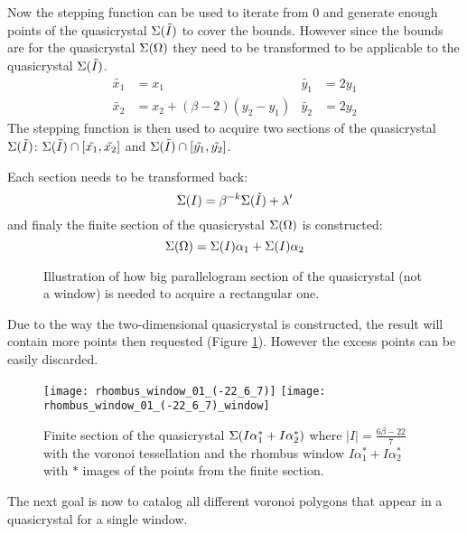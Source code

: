 \documentclass[text.tex]{subfiles}
\begin{document}
Now the stepping function can be used to iterate from 0 and generate enough points of the quasicrystal $\Sigma(\tilde{I})$ to cover the bounds. However since the bounds are for the quasicrystal $\Sigma(\Omega)$ they need to be transformed to be applicable to the quasicrystal $\Sigma(\tilde{I})$. 
\begin{align*}
\tilde{x_1} &= x_1 & \tilde{y_1} &= 2y_1 \\
\tilde{x_2} &= x_2 + (\beta-2)(y_2-y_1) & \tilde{y_2} &= 2y_2 
\end{align*}
The stepping function is then used to acquire two sections of the quasicrystal $\Sigma(\tilde{I})$: $\Sigma(\tilde{I})\cap[\tilde{x_1},\tilde{x_2}]$ and $\Sigma(\tilde{I})\cap[\tilde{y_1},\tilde{y_2}]$.

Each section needs to be transformed back:
$$\Sigma(I) = \beta^{-k}\Sigma(\tilde{I}) + \lambda'$$
and finaly the finite section of the quasicrystal $\Sigma(\Omega)$ is constructed:
$$\Sigma(\Omega) = \Sigma(I)\alpha_1 + \Sigma(I)\alpha_2$$

\begin{figure}[h]
\centering
{}
\caption{Illustration of how big parallelogram section of the quasicrystal (not a window) is needed to acquire a rectangular one.}
\label{fig:finiteSectionRhombus}
\end{figure}

\begin{remark}
Due to the way the two-dimensional quasicrystal is constructed, the result will contain more points then requested (Figure \ref{fig:finiteSectionRhombus}). However the excess points can be easily discarded.
\end{remark}

\begin{figure}[h]
\centering
\texttt{[image: rhombus\_window\_01\_(-22\_6\_7)]}
\texttt{[image: rhombus\_window\_01\_(-22\_6\_7)\_window]}
\caption{Finite section of the quasicrystal $\Sigma(I\alpha_1^\ast + I\alpha_2^\ast)$ where $|I| = \frac{6\beta-22}{7}$ with the voronoi tessellation and the rhombus window $I\alpha_1^\ast + I\alpha_2^\ast$ with $\ast$ images of the points from the finite section.}
\label{fig:finiteSectionQuasi}
\end{figure}

The next goal is now to catalog all different voronoi polygons that appear in a quasicrystal for a single window. 
\end{document}
